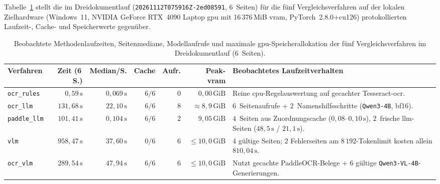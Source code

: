 Tabelle~\ref{tab:effizienz-messungen} stellt die im Dreidokumentlauf (\texttt{20261112T075916Z-2ed08591}, $6$~Seiten) für die fünf Vergleichsverfahren auf der lokalen Zielhardware (Windows~11, NVIDIA GeForce RTX~4090 Laptop \ac{gpu} mit \mbox{16\,376\,MiB} \ac{vram}, PyTorch~2.8.0+cu126) protokollierten Laufzeit-, Cache- und Speicherwerte gegenüber.

\begin{table}[htbp]
  \centering
  \caption[Beobachtete Methodenlaufzeiten, Modellaufrufe und GPU-Speicherallokation]{Beobachtete Methodenlaufzeiten, Seitenmediane, Modellaufrufe und maximale \ac{gpu}-Speicherallokation der fünf Vergleichsverfahren im Dreidokumentlauf ($6$~Seiten).}
  \label{tab:effizienz-messungen}
  \footnotesize
  \setlength{\tabcolsep}{4pt}
  \begin{tabularx}{\textwidth}{@{}l r r r r r >{\raggedright\arraybackslash}X@{}}
    \toprule
    \textbf{Verfahren} & \textbf{Zeit (6\,S.)} & \textbf{Median/S.} & \textbf{Cache} & \textbf{Aufr.} & \textbf{Peak-\ac{vram}} & \textbf{Beobachtetes Laufzeitverhalten} \\
    \midrule
    \texttt{ocr\_rules} & $0{,}59\,\mathrm{s}$ & $0{,}069\,\mathrm{s}$ & $6 / 6$ & $0$ & $0{,}00\,\text{GiB}$ & Reine \ac{cpu}-Regelauswertung auf gecachter Tesseract-\ac{ocr}. \\
    \texttt{ocr\_llm} & $131{,}68\,\mathrm{s}$ & $22{,}10\,\mathrm{s}$ & $6 / 6$ & $8$ & $\approx 8{,}9\,\text{GiB}$ & $6$~Seitenaufrufe + $2$~Namenshilfsschritte (\texttt{Qwen3-4B}, \ac{bf16}). \\
    \texttt{paddle\_llm} & $101{,}41\,\mathrm{s}$ & $0{,}104\,\mathrm{s}$ & $6 / 6$ & $2$ & $9{,}05\,\text{GiB}$ & $4$~Seiten aus Zuordnungscache ($0{,}08$--$0{,}10\,\mathrm{s}$), $2$~frische \ac{llm}-Seiten ($48{,}5\,\mathrm{s}$ / $21{,}1\,\mathrm{s}$). \\
    \texttt{vlm} & $958{,}47\,\mathrm{s}$ & $37{,}60\,\mathrm{s}$ & $0 / 6$ & $6$ & $\le 10{,}0\,\text{GiB}$ & $4$ gültige Seiten; $2$ Fehlerseiten am $8\,192$-Tokenlimit kosten allein $810{,}04\,\mathrm{s}$. \\
    \texttt{ocr\_vlm} & $289{,}54\,\mathrm{s}$ & $47{,}94\,\mathrm{s}$ & $6 / 6$ & $6$ & $\le 10{,}0\,\text{GiB}$ & Nutzt gecachte PaddleOCR-Belege + $6$ gültige \texttt{Qwen3-VL-4B}-Generierungen. \\
    \bottomrule
  \end{tabularx}
\end{table}

